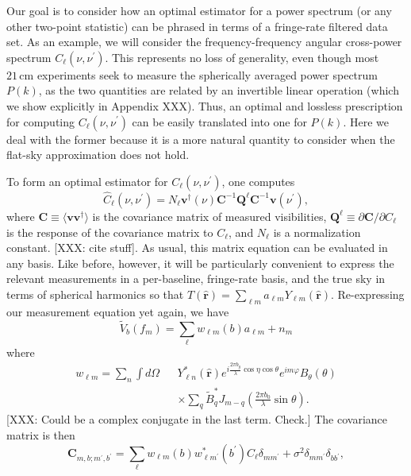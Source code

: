 \documentclass[twocolumn,apj,numberedappendix]{emulateapj}
\newcommand{\vis}{\mathbf{v}}
\newcommand{\rhat}{\hat{\mathbf{r}}}
\begin{document}
Our goal is to consider how an optimal estimator for a power spectrum (or any other two-point statistic) can be phrased in terms of a fringe-rate filtered data set.  As an example, we will consider the frequency-frequency angular cross-power spectrum $C_\ell (\nu, \nu^\prime)$.  This represents no loss of generality, even though most $21\,\textrm{cm}$ experiments seek to measure the spherically averaged power spectrum $P(k)$, as the two quantities are related by an invertible linear operation (which we show explicitly in Appendix XXX).  Thus, an optimal and lossless prescription for computing $C_\ell (\nu, \nu^\prime)$ can be easily translated into one for $P(k)$.  Here we deal with the former because it is a more natural quantity to consider when the flat-sky approximation does not hold.

To form an optimal estimator for $C_\ell (\nu, \nu^\prime)$, one computes
\begin{equation}
\label{eq:generalEst}
\widehat{C}_\ell (\nu, \nu^\prime)  = N_\ell \vis^\dagger(\nu) \mathbf{C}^{-1} \mathbf{Q}^\ell \mathbf{C}^{-1} \vis(\nu^\prime),
\end{equation}
where $\mathbf{C} \equiv \langle \vis \vis^\dagger \rangle$ is the covariance matrix of measured visibilities, $\mathbf{Q}^\ell \equiv \partial \mathbf{C} / \partial C_\ell $ is the response of the covariance matrix to $C_\ell$, and $N_\ell$ is a normalization constant.  [XXX: cite stuff].  As usual, this matrix equation can be evaluated in any basis.  Like before, however, it will be particularly convenient to express the relevant measurements in a per-baseline, fringe-rate basis, and the true sky in terms of spherical harmonics so that $T(\rhat) = \sum_{\ell m} a_{\ell m} Y_{\ell m} (\rhat)$.  Re-expressing our measurement equation yet again, we have
\begin{equation}
\widetilde{V}_b (f_m) = \sum_\ell w_{\ell m} (b) a_{\ell m} + n_{m}
\end{equation}
where
\begin{eqnarray}
w_{\ell m} = \sum_n \int d\Omega && Y_{\ell n}^*(\rhat) e^{i \frac{2 \pi b_y}{\lambda} \cos \eta \cos \theta} e^{i m \varphi} B_\theta (\theta) \nonumber \\
&&\times \sum_q \widetilde{B}^*_q  J_{m-q} \left( \frac{2 \pi b_0}{\lambda} \sin \theta \right).
\end{eqnarray}
[XXX: Could be a complex conjugate in the last term.  Check.]  The covariance matrix is then
\begin{equation}
\mathbf{C}_{m,b;m^\prime,b^\prime} = \sum_\ell w_{\ell m}(b) w^*_{\ell m^\prime }(b^\prime) C_\ell \delta_{m m^\prime} + \sigma^2 \delta_{m m^\prime} \delta_{b b^\prime},
\end{equation}
\end{document}
